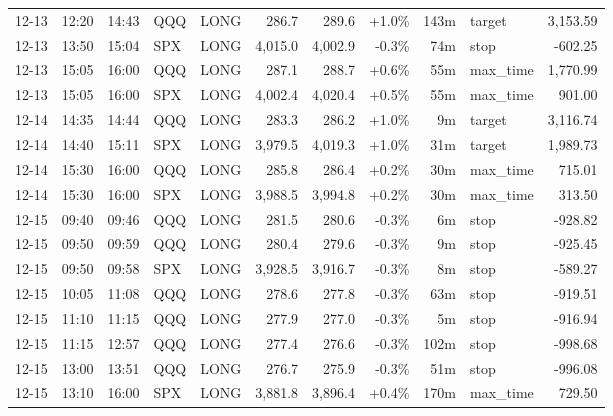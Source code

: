 \documentclass[11pt,a4paper,twoside]{article}
\begin{document}
\begin{center}
\begin{longtable}{>{\color{txtmain}}l l l l l r r r r >{\color{txtmain}}l r}
12-13 & 12:20 & 14:43 & QQQ & LONG & 286.7 & 289.6 & \textcolor{wingreen}{+1.0\%} & 143m & target & \textcolor{wingreen}{3,153.59} \\
12-13 & 13:50 & 15:04 & SPX & LONG & 4,015.0 & 4,002.9 & \textcolor{lossred}{-0.3\%} & 74m & stop & \textcolor{lossred}{-602.25} \\
12-13 & 15:05 & 16:00 & QQQ & LONG & 287.1 & 288.7 & \textcolor{wingreen}{+0.6\%} & 55m & max\_time & \textcolor{wingreen}{1,770.99} \\
12-13 & 15:05 & 16:00 & SPX & LONG & 4,002.4 & 4,020.4 & \textcolor{wingreen}{+0.5\%} & 55m & max\_time & \textcolor{wingreen}{901.00} \\
12-14 & 14:35 & 14:44 & QQQ & LONG & 283.3 & 286.2 & \textcolor{wingreen}{+1.0\%} & 9m & target & \textcolor{wingreen}{3,116.74} \\
12-14 & 14:40 & 15:11 & SPX & LONG & 3,979.5 & 4,019.3 & \textcolor{wingreen}{+1.0\%} & 31m & target & \textcolor{wingreen}{1,989.73} \\
12-14 & 15:30 & 16:00 & QQQ & LONG & 285.8 & 286.4 & \textcolor{wingreen}{+0.2\%} & 30m & max\_time & \textcolor{wingreen}{715.01} \\
12-14 & 15:30 & 16:00 & SPX & LONG & 3,988.5 & 3,994.8 & \textcolor{wingreen}{+0.2\%} & 30m & max\_time & \textcolor{wingreen}{313.50} \\
12-15 & 09:40 & 09:46 & QQQ & LONG & 281.5 & 280.6 & \textcolor{lossred}{-0.3\%} & 6m & stop & \textcolor{lossred}{-928.82} \\
12-15 & 09:50 & 09:59 & QQQ & LONG & 280.4 & 279.6 & \textcolor{lossred}{-0.3\%} & 9m & stop & \textcolor{lossred}{-925.45} \\
12-15 & 09:50 & 09:58 & SPX & LONG & 3,928.5 & 3,916.7 & \textcolor{lossred}{-0.3\%} & 8m & stop & \textcolor{lossred}{-589.27} \\
12-15 & 10:05 & 11:08 & QQQ & LONG & 278.6 & 277.8 & \textcolor{lossred}{-0.3\%} & 63m & stop & \textcolor{lossred}{-919.51} \\
12-15 & 11:10 & 11:15 & QQQ & LONG & 277.9 & 277.0 & \textcolor{lossred}{-0.3\%} & 5m & stop & \textcolor{lossred}{-916.94} \\
12-15 & 11:15 & 12:57 & QQQ & LONG & 277.4 & 276.6 & \textcolor{lossred}{-0.3\%} & 102m & stop & \textcolor{lossred}{-998.68} \\
12-15 & 13:00 & 13:51 & QQQ & LONG & 276.7 & 275.9 & \textcolor{lossred}{-0.3\%} & 51m & stop & \textcolor{lossred}{-996.08} \\
12-15 & 13:10 & 16:00 & SPX & LONG & 3,881.8 & 3,896.4 & \textcolor{wingreen}{+0.4\%} & 170m & max\_time & \textcolor{wingreen}{729.50} \\

\end{longtable}
\end{center}
\end{document}
